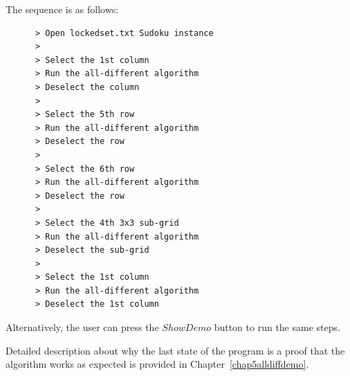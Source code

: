 \documentclass{l4proj}
\begin{document}
\begin{appendices}
\noindent The sequence is as follows:
\begin{verbatim}
      > Open lockedset.txt Sudoku instance
      >
      > Select the 1st column
      > Run the all-different algorithm
      > Deselect the column
      >
      > Select the 5th row
      > Run the all-different algorithm
      > Deselect the row
      >
      > Select the 6th row
      > Run the all-different algorithm
      > Deselect the row
      >
      > Select the 4th 3x3 sub-grid
      > Run the all-different algorithm
      > Deselect the sub-grid
      >
      > Select the 1st column
      > Run the all-different algorithm
      > Deselect the 1st column
\end{verbatim}

\noindent Alternatively, the user can press the $Show Demo$ button to run the same steps.

\noindent Detailed description about why the last state of the program is a proof that the algorithm works as expected is provided in Chapter~\ref{chap5alldiffdemo}.
\end{appendices}


%
%
\printbibliography
\end{document}
